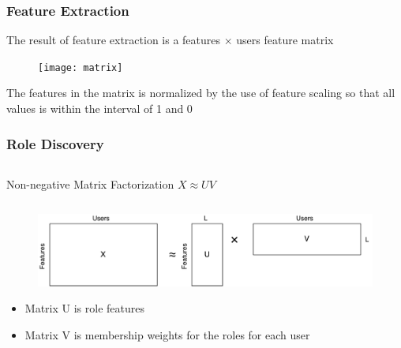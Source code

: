 \begin{frame}
\frametitle{Feature Extraction}

The result of feature extraction is a features $\times$ users feature matrix

\begin{figure}
	\texttt{[image: matrix]}
\end{figure}

The features in the matrix is normalized by the use of feature scaling so that all values is within the interval of 1 and 0

\end{frame}

\begin{frame}
\frametitle{Role Discovery}
\begin{columns}\centering
	\begin{column}{0.5\textwidth}
		\begin{block}{\small Non-negative Matrix Factorization}\centering
			$X \approx UV$
		\end{block}
		\end{column}
\end{columns}
\begin{figure}
\includegraphics[scale=.3]{graphics/nmf}
\end{figure}

\begin{itemize}
\item Matrix U is role features 
\item Matrix V is membership weights for the roles for each user
\end{itemize}
\end{frame}


